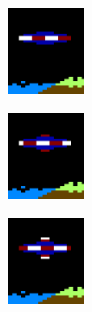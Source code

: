 \begin{figure}[H]
  {
    \setlength{\tabcolsep}{3.0pt}
    \setlength\cmidrulewidth{\heavyrulewidth} %
	\centering
	\begin{subfigure}{0.3\textwidth}
    \includegraphics[width=2cm]{src/sprites/gallery/sprite_160.png}%
	\end{subfigure}
	\begin{subfigure}{0.3\textwidth}
    \includegraphics[width=2cm]{src/sprites/gallery/sprite_161.png}%
	\end{subfigure}
	\begin{subfigure}{0.3\textwidth}
    \includegraphics[width=2cm]{src/sprites/gallery/sprite_162.png}%
	\end{subfigure}
  }

  {
  \setlength{\tabcolsep}{3.0pt}
  \setlength\cmidrulewidth{\heavyrulewidth} %
  \begin{adjustbox}{width=13cm}


\end{adjustbox}}
\end{figure}
